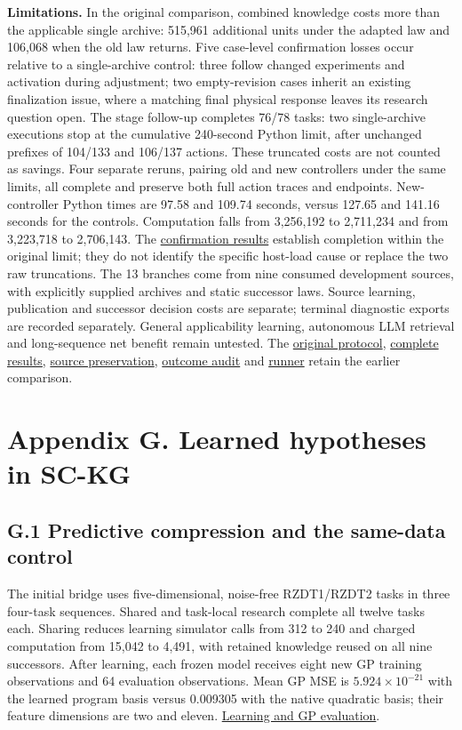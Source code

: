 \documentclass[11pt,a4paper]{article}
\begin{document}
\textbf{Limitations.} In the original comparison, combined knowledge costs more than the applicable single archive: 515,961 additional units under the adapted law and 106,068 when the old law returns. Five case-level confirmation losses occur relative to a single-archive control: three follow changed experiments and activation during adjustment; two empty-revision cases inherit an existing finalization issue, where a matching final physical response leaves its research question open. The stage follow-up completes 76/78 tasks: two single-archive executions stop at the cumulative 240-second Python limit, after unchanged prefixes of 104/133 and 106/137 actions. These truncated costs are not counted as savings. Four separate reruns, pairing old and new controllers under the same limits, all complete and preserve both full action traces and endpoints. New-controller Python times are 97.58 and 109.74 seconds, versus 127.65 and 141.16 seconds for the controls. Computation falls from 3,256,192 to 2,711,234 and from 3,223,718 to 2,706,143. The \hyperlink{artifact-151}{confirmation results} establish completion within the original limit; they do not identify the specific host-load cause or replace the two raw truncations. The 13 branches come from nine consumed development sources, with explicitly supplied archives and static successor laws. Source learning, publication and successor decision costs are separate; terminal diagnostic exports are recorded separately. General applicability learning, autonomous LLM retrieval and long-sequence net benefit remain untested. The \hyperlink{artifact-152}{original protocol}, \hyperlink{artifact-153}{complete results}, \hyperlink{artifact-154}{source preservation}, \hyperlink{artifact-155}{outcome audit} and \hyperlink{artifact-156}{runner} retain the earlier comparison.


\section*{Appendix G. Learned hypotheses in SC-KG}

\subsection*{G.1 Predictive compression and the same-data control}

The initial bridge uses five-dimensional, noise-free RZDT1/RZDT2 tasks in three
four-task sequences. Shared and task-local research complete all twelve tasks
each. Sharing reduces learning simulator calls from 312 to 240 and charged
computation from 15,042 to 4,491, with retained knowledge reused on all nine
successors. After learning, each frozen model receives eight new GP training
observations and 64 evaluation observations. Mean GP MSE is
\(5.924\times10^{-21}\) with the learned program basis versus 0.009305 with the
native quadratic basis; their feature dimensions are two and eleven.
\hyperlink{artifact-157}{Learning and GP evaluation}.
\end{document}
